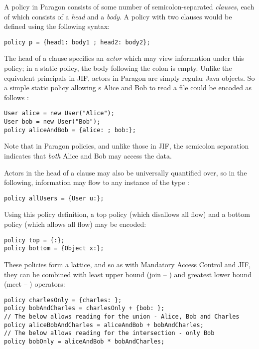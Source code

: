 A policy in Paragon consists of some number of semicolon-separated \textit{clauses}, each of which consists of a \textit{head} and a \textit{body}. A policy  with two clauses would be defined using the following syntax:

\begin{verbatim}
policy p = {head1: body1 ; head2: body2};
\end{verbatim}

The head of a clause specifies an \textit{actor} which may view information under this policy; in a static policy, the body following the colon is empty. Unlike the equivalent principals in JIF, actors in Paragon are simply regular Java objects. So a simple static policy allowing s Alice and Bob to read a file could be encoded as follows \cite{broberg2013paragon}:

\begin{verbatim}
User alice = new User("Alice");
User bob = new User("Bob");
policy aliceAndBob = {alice: ; bob:};
\end{verbatim}

Note that in Paragon policies, and unlike those in JIF, the semicolon separation indicates that \textit{both} Alice and Bob may access the data.

Actors in the head of a clause may also be universally quantified over, so in the following, information may flow to any instance of the type :

\begin{verbatim}
policy allUsers = {User u:};
\end{verbatim}

Using this policy definition, a top policy (which disallows all flow) and a bottom policy (which allows all flow) may be encoded:

\begin{verbatim}
policy top = {:};
policy bottom = {Object x:};
\end{verbatim}

These policies form a lattice, and so as with Mandatory Access Control and JIF, they can be combined with least upper bound (join -- \code{*}) and greatest lower bound (meet -- \code{+}) operators:

\begin{verbatim}
policy charlesOnly = {charles: };
policy bobAndCharles = charlesOnly + {bob: };
// The below allows reading for the union - Alice, Bob and Charles
policy aliceBobAndCharles = aliceAndBob + bobAndCharles;
// The below allows reading for the intersection - only Bob
policy bobOnly = aliceAndBob * bobAndCharles;
\end{verbatim}


